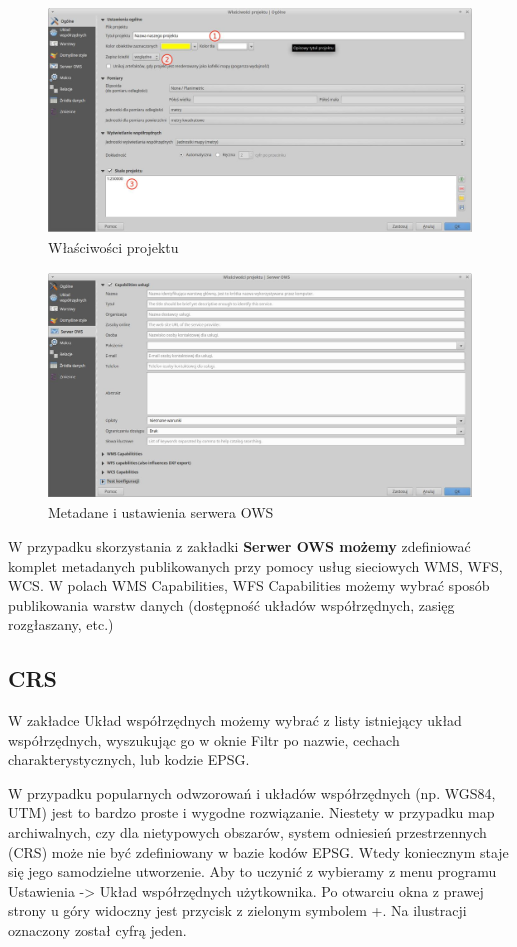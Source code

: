 \documentclass[12pt,a4paper]{book}
\begin{document}
\begin{figure}[ht]
	\centering
	\includegraphics[height=6cm]{002-projekt.png}
	\caption{Właściwości projektu}
\end{figure}
\begin{figure}[ht]
	\centering
	\includegraphics[height=6cm]{002-projekt-ows.jpg}
	\caption{Metadane i ustawienia serwera OWS}
\end{figure}

W przypadku skorzystania z zakładki \textbf{Serwer OWS możemy }zdefiniować komplet metadanych publikowanych przy pomocy usług sieciowych WMS, WFS, WCS. W polach WMS Capabilities, WFS Capabilities możemy wybrać sposób publikowania warstw danych (dostępność układów współrzędnych, zasięg rozgłaszany, etc.)

\subsection{CRS}
W zakładce Układ współrzędnych możemy wybrać z listy istniejący układ współrzędnych, wyszukując go w oknie Filtr po nazwie, cechach charakterystycznych, lub kodzie EPSG.

W przypadku popularnych odwzorowań i układów współrzędnych (np. WGS84, UTM) jest to bardzo proste i wygodne rozwiązanie. Niestety w przypadku map archiwalnych, czy dla nietypowych obszarów, system odniesień przestrzennych (CRS) może nie być zdefiniowany w bazie kodów EPSG. Wtedy koniecznym staje się jego samodzielne utworzenie. Aby to uczynić z wybieramy z menu programu Ustawienia -{\textgreater} Układ współrzędnych użytkownika. Po otwarciu okna z prawej strony u góry widoczny jest przycisk z zielonym symbolem +. Na ilustracji oznaczony został cyfrą jeden.
\end{document}
